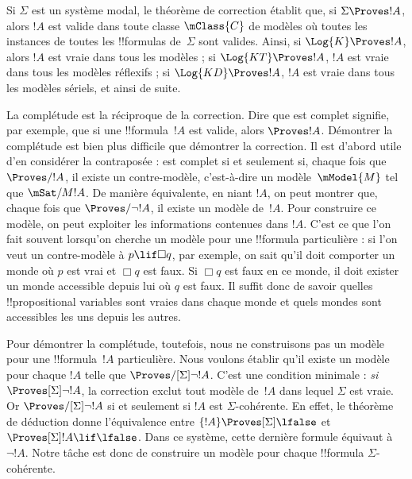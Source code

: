 \documentclass[../../../include/open-logic-section]{subfiles}
\begin{document}


Si $\Sigma$ est un système modal, le théorème de correction établit
que, si $\Sigma \Proves !A$, alors $!A$ est valide dans toute classe
$\mClass{C}$ de modèles où toutes les instances de toutes les
!!{formula}s de~$\Sigma$ sont valides. Ainsi, si $\Log{K}
\Proves !A$, alors $!A$ est vraie dans tous les modèles ; si
$\Log{KT} \Proves !A$, $!A$ est vraie dans tous les modèles réflexifs ;
si $\Log{KD} \Proves !A$, $!A$ est vraie dans tous les modèles sériels,
et ainsi de suite.

La complétude est la réciproque de la correction. Dire que  est
complet signifie, par exemple, que si une !!{formula}~$!A$ est valide,
alors $\Proves !A$. Démontrer la complétude est bien plus difficile
que démontrer la correction. Il est d'abord utile d'en considérer la
contraposée :  est complet si et seulement si, chaque fois que
$\Proves/ !A$, il existe un contre-modèle, c'est-à-dire un
modèle~$\mModel{M}$ tel que $\mSat/{M}{!A}$. De manière équivalente,
en niant $!A$, on peut montrer que, chaque fois que
$\Proves/ \lnot !A$, il existe un modèle de~$!A$. Pour construire ce
modèle, on peut exploiter les informations contenues dans $!A$. C'est
ce que l'on fait souvent lorsqu'on cherche un modèle pour une
!!{formula} particulière : si l'on veut un contre-modèle à
$p \lif \Box q$, par exemple, on sait qu'il doit comporter un monde
où $p$ est vrai et $\Box q$ est faux. Si $\Box q$ est faux en ce
monde, il doit exister un monde accessible depuis lui où $q$ est
faux. Il suffit donc de savoir quelles !!{propositional variable}s
sont vraies dans chaque monde et quels mondes sont accessibles les
uns depuis les autres.

Pour démontrer la complétude, toutefois, nous ne construisons pas un
modèle pour une !!{formula}~$!A$ particulière. Nous voulons établir
qu'il existe un modèle pour chaque $!A$ telle que
$\Proves/[\Sigma] \lnot !A$. C'est une condition minimale :
\emph{si} $\Proves[\Sigma] \lnot !A$, la correction exclut tout
modèle de~$!A$ dans lequel $\Sigma$ est vraie. Or
$\Proves/[\Sigma] \lnot !A$ si et seulement si $!A$ est
$\Sigma$-cohérente. En effet, le théorème de déduction donne
l'équivalence entre $\{!A\} \Proves[\Sigma] \lfalse$ et
$\Proves[\Sigma] !A \lif \lfalse$. Dans ce système, cette dernière
formule équivaut à $\lnot !A$. Notre tâche est donc de construire
un modèle pour chaque !!{formula} $\Sigma$-cohérente.
\end{document}
